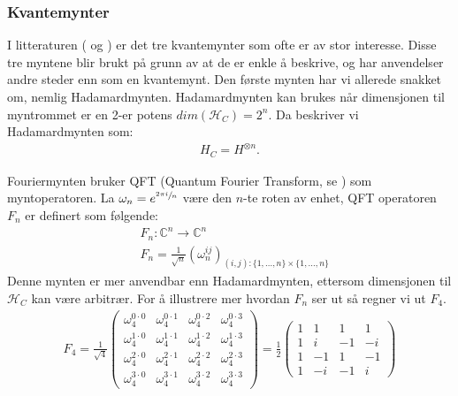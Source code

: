     \subsubsection*{Kvantemynter}

        I litteraturen (\cite{Venegas_Andraca_2012} og \cite{portugal_2019}) er det tre kvantemynter som ofte er av stor interesse. Disse tre myntene blir brukt på grunn av at de er enkle å beskrive, og har anvendelser andre steder enn som en kvantemynt. Den første mynten har vi allerede snakket om, nemlig Hadamardmynten. Hadamardmynten kan brukes når dimensjonen til myntrommet er en 2-er potens $dim(\mathcal{H}_C)=2^n$. Da beskriver vi Hadamardmynten som:
        \begin{align*}
            H_C=H^{\otimes n}.
        \end{align*}

        Fouriermynten bruker QFT (Quantum Fourier Transform, se \cite{dewolf2021quantum}) som myntoperatoren. La $\omega_n = e^{\sfrac{2\pi i}{n}}$ være den $n$-te roten av enhet, QFT operatoren $F_n$ er definert som følgende:
        \begin{align*}
            & F_n : \mathbb{C}^n\rightarrow\mathbb{C}^n \\
            & F_n = \frac{1}{\sqrt{n}}(\omega_n^{ij})_{(i,j):\{1,...,n\}\times \{1,...,n\}}
        \end{align*}
        Denne mynten er mer anvendbar enn Hadamardmynten, ettersom dimensjonen til $\mathcal{H}_C$ kan være arbitrær. For å illustrere mer hvordan $F_n$ ser ut så regner vi ut $F_4$.
        \begin{align*}
            F_4 = \frac{1}{\sqrt{4}}\begin{pmatrix}
                \omega_4^{0\cdot 0} & \omega_4^{0\cdot 1} & \omega_4^{0\cdot 2} & \omega_4^{0\cdot 3} \\
                \omega_4^{1\cdot 0} & \omega_4^{1\cdot 1} & \omega_4^{1\cdot 2} & \omega_4^{1\cdot 3} \\
                \omega_4^{2\cdot 0} & \omega_4^{2\cdot 1} & \omega_4^{2\cdot 2} & \omega_4^{2\cdot 3} \\
                \omega_4^{3\cdot 0} & \omega_4^{3\cdot 1} & \omega_4^{3\cdot 2} & \omega_4^{3\cdot 3}
            \end{pmatrix}
            = \frac{1}{2}\begin{pmatrix}
                1 & 1 & 1 & 1 \\
                1 & i & -1 & -i \\
                1 & -1 & 1 & -1 \\
                1 & -i & -1 & i
            \end{pmatrix}
        \end{align*}

